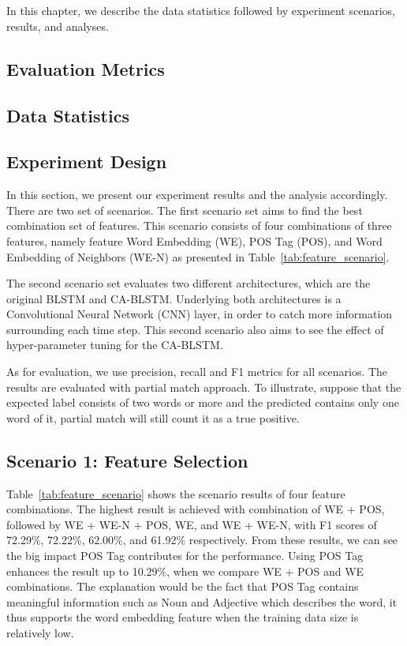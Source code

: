 \chapter{\babLima}

In this chapter, we describe the data statistics followed by experiment scenarios, results, and analyses.

\section{Evaluation Metrics}

\section{Data Statistics}

\section{Experiment Design}

In this section, we present our experiment results and the analysis accordingly. There are two set of scenarios. The first scenario set aims to find the best combination set of features. This scenario consists of four combinations of three features, namely feature Word Embedding (WE), POS Tag (POS), and Word Embedding of Neighbors (WE-N) as presented in Table~\ref{tab:feature_scenario}.

The second scenario set evaluates two different architectures, which are the original BLSTM and CA-BLSTM. Underlying both architectures is a Convolutional Neural Network (CNN) layer, in order to catch more information surrounding each time step. This second scenario also aims to see the effect of hyper-parameter tuning for the CA-BLSTM.

As for evaluation, we use precision, recall and F1 metrics for all scenarios. The results are evaluated with partial match approach. To illustrate, suppose that the expected label consists of two words or more and the predicted contains only one word of it, partial match will still count it as a true positive.

\section{Scenario 1: Feature Selection}
Table~\ref{tab:feature_scenario} shows the scenario results of four feature combinations. The highest result is achieved with combination of WE + POS, followed by WE + WE-N + POS, WE, and WE + WE-N, with F1 scores of 72.29\%, 72.22\%, 62.00\%, and 61.92\% respectively. From these results, we can see the big impact POS Tag contributes for the performance. Using POS Tag enhances the result up to 10.29\%, when we compare WE + POS and WE combinations. The explanation would be the fact that POS Tag contains meaningful information such as Noun and Adjective which describes the word, it thus supports the word embedding feature when the training data size is relatively low.


